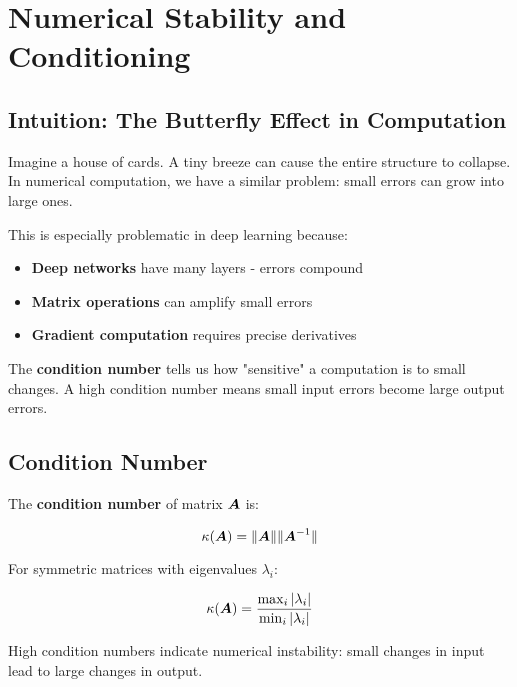 
\section{Numerical Stability and Conditioning }
\label{sec:numerical-stability}

\subsection{Intuition: The Butterfly Effect in Computation}

Imagine a house of cards. A tiny breeze can cause the entire structure to collapse. In numerical computation, we have a similar problem: small errors can grow into large ones.

This is especially problematic in deep learning because:
\begin{itemize}
    \item \textbf{Deep networks} have many layers - errors compound
    \item \textbf{Matrix operations} can amplify small errors
    \item \textbf{Gradient computation} requires precise derivatives
\end{itemize}

The \textbf{condition number} tells us how "sensitive" a computation is to small changes. A high condition number means small input errors become large output errors.

\subsection{Condition Number}

The \textbf{condition number} of matrix $\boldsymbol{A}$ is:

\begin{equation}
\kappa(\boldsymbol{A}) = \|\boldsymbol{A}\| \|\boldsymbol{A}^{-1}\|
\end{equation}

For symmetric matrices with eigenvalues $\lambda_i$:

\begin{equation}
\kappa(\boldsymbol{A}) = \frac{\max_i |\lambda_i|}{\min_i |\lambda_i|}
\end{equation}

High condition numbers indicate numerical instability: small changes in input lead to large changes in output.

